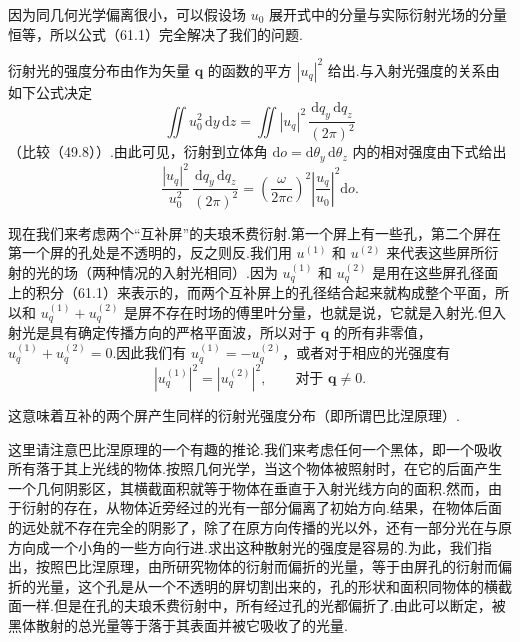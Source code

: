 因为同几何光学偏离很小，可以假设场 $u_0$ 展开式中的分量与实际衍射光场的分量恒等，所以公式（61.1）完全解决了我们的问题.

衍射光的强度分布由作为矢量 $\boldsymbol{q}$ 的函数的平方 $|u_q|^2$ 给出.与入射光强度的关系由如下公式决定
\begin{equation}
  \iint u_0^2\,\mathrm{d}y\,\mathrm{d}z
  =\iint|u_q|^2\,\frac{\mathrm{d}q_y\,\mathrm{d}q_z}{(2\pi)^2}
\end{equation}
（比较（49.8））.由此可见，衍射到立体角 $\mathrm{d}o=\mathrm{d}\theta_y\,\mathrm{d}\theta_z$ 内的相对强度由下式给出
\begin{equation}
  \frac{|u_q|^2}{u_0^2}\,\frac{\mathrm{d}q_y\,\mathrm{d}q_z}{(2\pi)^2}
  =\left(\frac{\omega}{2\pi c}\right)^2
  \left|\frac{u_q}{u_0}\right|^2\mathrm{d}o.
\end{equation}

现在我们来考虑两个“互补屏”的夫琅禾费衍射.第一个屏上有一些孔，第二个屏在第一个屏的孔处是不透明的，反之则反.我们用 $u^{(1)}$ 和 $u^{(2)}$ 来代表这些屏所衍射的光的场（两种情况的入射光相同）.因为 $u_q^{(1)}$ 和 $u_q^{(2)}$ 是用在这些屏孔径面上的积分（61.1）来表示的，而两个互补屏上的孔径结合起来就构成整个平面，所以和 $u_q^{(1)}+u_q^{(2)}$ 是屏不存在时场的傅里叶分量，也就是说，它就是入射光.但入射光是具有确定传播方向的严格平面波，所以对于 $\boldsymbol{q}$ 的所有非零值，$u_q^{(1)}+u_q^{(2)}=0$.因此我们有 $u_q^{(1)}=-u_q^{(2)}$，或者对于相应的光强度有
\begin{equation}
  |u_q^{(1)}|^2=|u_q^{(2)}|^2,\qquad
  \text{对于 }\boldsymbol{q}\neq 0.
\end{equation}

这意味着互补的两个屏产生同样的衍射光强度分布（即所谓巴比涅原理）.

这里请注意巴比涅原理的一个有趣的推论.我们来考虑任何一个黑体，即一个吸收所有落于其上光线的物体.按照几何光学，当这个物体被照射时，在它的后面产生一个几何阴影区，其横截面积就等于物体在垂直于入射光线方向的面积.然而，由于衍射的存在，从物体近旁经过的光有一部分偏离了初始方向.结果，在物体后面的远处就不存在完全的阴影了，除了在原方向传播的光以外，还有一部分光在与原方向成一个小角的一些方向行进.求出这种散射光的强度是容易的.为此，我们指出，按照巴比涅原理，由所研究物体的衍射而偏折的光量，等于由屏孔的衍射而偏折的光量，这个孔是从一个不透明的屏切割出来的，孔的形状和面积同物体的横截面一样.但是在孔的夫琅禾费衍射中，所有经过孔的光都偏折了.由此可以断定，被黑体散射的总光量等于落于其表面并被它吸收了的光量.

